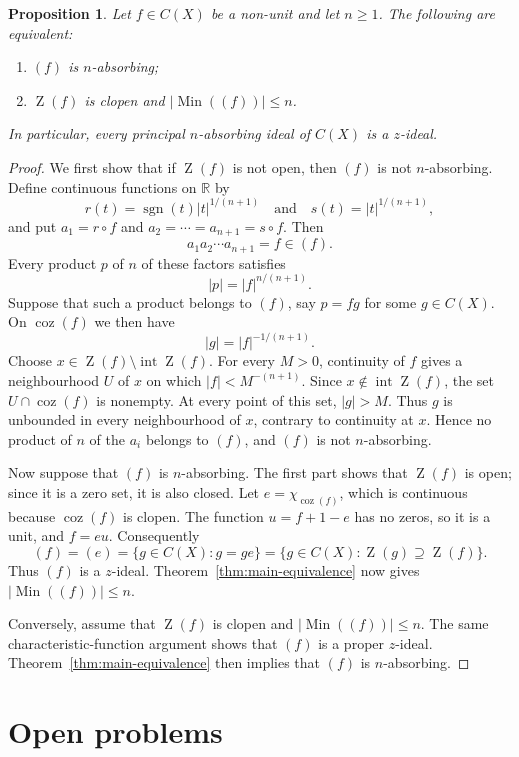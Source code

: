 \documentclass[11pt]{amsart}
\newtheorem{proposition}[theorem]{Proposition}
\theoremstyle{definition}
\theoremstyle{remark}
\DeclareMathOperator{\coz}{coz}
\DeclareMathOperator{\Min}{Min}
\DeclareMathOperator{\Z}{Z}
\begin{document}
\begin{proposition}
\label{prop:principal}
Let $f\in C(X)$ be a non-unit and let $n\ge1$. The following are
equivalent:
\begin{enumerate}[label=\textup{(\roman*)}]
\item $(f)$ is $n$-absorbing;
\item $\Z(f)$ is clopen and $|\Min((f))|\le n$.
\end{enumerate}
In particular, every principal $n$-absorbing ideal of $C(X)$ is a
$z$-ideal.
\end{proposition}

\begin{proof}
We first show that if $\Z(f)$ is not open, then $(f)$ is not
$n$-absorbing. Define continuous functions on $\mathbb R$ by
\[
r(t)=\operatorname{sgn}(t)|t|^{1/(n+1)}
\quad\text{and}\quad
s(t)=|t|^{1/(n+1)},
\]
and put $a_1=r\circ f$ and $a_2=\cdots=a_{n+1}=s\circ f$.
Then
\[
a_1a_2\cdots a_{n+1}=f\in(f).
\]
Every product $p$ of $n$ of these factors satisfies
\[
|p|=|f|^{n/(n+1)}.
\]
Suppose that such a product belongs to $(f)$, say $p=fg$ for some
$g\in C(X)$. On $\coz(f)$ we then have
\[
|g|=|f|^{-1/(n+1)}.
\]
Choose $x\in\Z(f)\setminus\operatorname{int}\Z(f)$. For every
$M>0$, continuity of $f$ gives a neighbourhood $U$ of $x$ on which
$|f|<M^{-(n+1)}$. Since $x\notin\operatorname{int}\Z(f)$,
the set $U\cap\coz(f)$ is nonempty. At every point of this set,
$|g|>M$. Thus $g$ is unbounded in every neighbourhood of $x$,
contrary to continuity at $x$. Hence no product of $n$ of the
$a_i$ belongs to $(f)$, and $(f)$ is not $n$-absorbing.

Now suppose that $(f)$ is $n$-absorbing. The first part shows that
$\Z(f)$ is open; since it is a zero set, it is also closed. Let
$e=\chi_{\coz(f)}$, which is continuous because $\coz(f)$ is clopen.
The function $u=f+1-e$ has no zeros, so it is a unit, and $f=eu$.
Consequently
\[
(f)=(e)=\{g\in C(X):g=ge\}
     =\{g\in C(X):\Z(g)\supseteq\Z(f)\}.
\]
Thus $(f)$ is a $z$-ideal. Theorem~\ref{thm:main-equivalence}
now gives $|\Min((f))|\le n$.

Conversely, assume that $\Z(f)$ is clopen and
$|\Min((f))|\le n$. The same characteristic-function argument shows
that $(f)$ is a proper $z$-ideal. Theorem~\ref{thm:main-equivalence}
then implies that $(f)$ is $n$-absorbing.
\end{proof}

\section{Open problems}
\label{sec:open}
\end{document}
